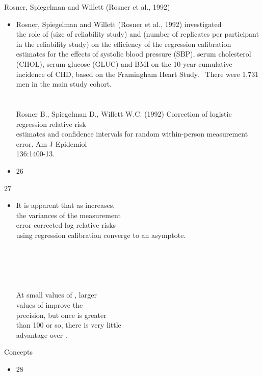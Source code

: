 \documentclass{beamer}
\begin{document}
\begin{frame}{Rosner, Spiegelman and Willett (Rosner et al., 1992)}
\begin{itemize}
\item Rosner, Spiegelman and Willett (Rosner et al., 1992) investigated  \\ the role of        (size of reliability study) and       (number of replicates per participant in the reliability study)  on the efficiency of the regression calibration estimates for the effects of systolic blood pressure (SBP), serum cholesterol (CHOL), serum glucose (GLUC) and BMI on the 10-year cumulative  incidence of CHD, based on the Framingham Heart Study.  There were 1,731 men in the main study cohort. \\  \\  \\ Rosner B., Spiegelman D., Willett W.C. (1992) Correction of logistic regression relative risk \\ estimates and confidence intervals for random within-person measurement error. Am J Epidemiol  \\ 136:1400-13.
\end{itemize}
\begin{itemize}
\item 26
\end{itemize}
\end{frame}
\begin{frame}{27}
\begin{itemize}
\item It is apparent that as         increases,  \\ the variances of the measurement \\ error corrected log relative risks \\ using regression calibration  converge to an asymptote.  \\   \\  \\  \\  \\  \\ At small values of         , larger  \\ values of           improve the  \\ precision, but once         is greater  \\ than 100 or so, there  is very little  \\ advantage over                .
\end{itemize}
\end{frame}
\begin{frame}{Concepts}
\begin{itemize}
\item 28
\end{itemize}
\end{frame}
\end{document}
